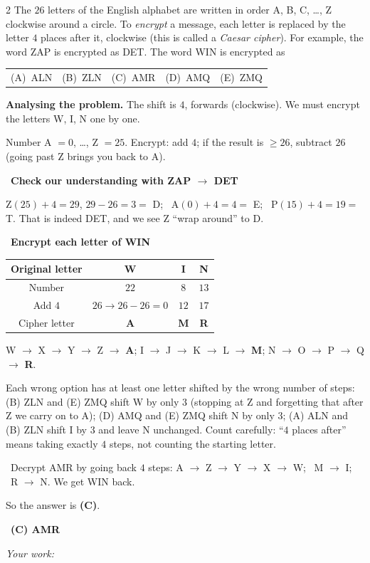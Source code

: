 \documentclass[11pt]{article}
\makeatletter
\newif\ifsol \solfalse
\providecommand{\AnsWord}{Đáp số}
\newenvironment{probbox}[2]{\begin{probboxT}{#1}{#2}}{\end{probboxT}}
\newcommand{\StuProb}[2]{\begin{probboxS}{#1}{#2}\StuProbBody\end{probboxS}}
\newcommand{\ans}[1]{\par\smallskip{\bfseries\color{tmGreen!88!black}\AnsWord:}\ {\bfseries\color{AnsRed}#1}\par}
\newcommand{\probsol}[1]{%
  \begin{lrbox}{\solmeasure}\begin{minipage}{\dimexpr\linewidth-24pt\relax}#1\end{minipage}\end{lrbox}%
  \ifsol
    \begin{solbox}#1\end{solbox}%
  \else
    \setlength{\solht}{\dimexpr\ht\solmeasure+\dp\solmeasure+0.85cm\relax}%
    \ifdim\solht<1.35cm\setlength{\solht}{1.35cm}\fi
    \ifdim\solht>\StudentMaxWork\setlength{\solht}{\StudentMaxWork}\fi
    \par\noindent\begin{minipage}{\linewidth}%
    \expandafter\StuProb\StuProbArgs
    \begin{tcolorbox}[colback=white,colframe=Line,boxrule=0.8pt,arc=5pt,
      left=8pt,right=8pt,top=4pt,bottom=4pt,height=\solht]{\footnotesize\color{Slate}\itshape\WorkWord}\end{tcolorbox}%
    \end{minipage}\par\medskip
  \fi}
\newlength{\StudentMaxWork}\setlength{\StudentMaxWork}{4.5cm}
\newcommand{\step}[2]{\par\smallskip\noindent{\bfseries\color{tmBlue!85!black}\StepWord~#1.}\ {\bfseries #2}\par\nopagebreak}
\newcommand{\verify}[1]{\par\smallskip\noindent{\bfseries\color{tmGreen!80!black}\faCheckCircle\ \CheckWord}\ #1\par}
\newcommand{\choices}[5]{\par\smallskip\noindent
  \begin{tabularx}{\linewidth}{@{}XXXXX@{}}(A)\ #1&(B)\ #2&(C)\ #3&(D)\ #4&(E)\ #5\end{tabularx}\par}
\def\WorkWord{Your work:}
\def\AnsWord{Answer}
\def\StepWord{Step}
\def\CheckWord{Check:}
\makeatother
\begin{document}
\begin{probbox}{2}{\relax}
The $26$ letters of the English alphabet are written in order A, B, C, \ldots, Z clockwise around a circle. To \emph{encrypt} a message,
each letter is replaced by the letter $4$ places after it, clockwise (this is called a \emph{Caesar cipher}). For example, the word ZAP
is encrypted as DET. The word WIN is encrypted as
\choices{ALN}{ZLN}{AMR}{AMQ}{ZMQ}
\end{probbox}
\probsol{
\textbf{Analysing the problem.} The shift is $4$, forwards (clockwise). We must encrypt the letters W, I, N one by one.
\begin{recallbox}Number A $= 0$, \ldots, Z $= 25$. Encrypt: add $4$; if the result is $\ge 26$, subtract $26$ (going past Z brings you back to A).\end{recallbox}
\step{1}{Check our understanding with ZAP $\to$ DET}
Z$(25) + 4 = 29$, $29 - 26 = 3 =$ D; \ A$(0) + 4 = 4 =$ E; \ P$(15) + 4 = 19 =$ T. That is indeed DET, and we see Z ``wrap around'' to D.
\step{2}{Encrypt each letter of WIN}
\begin{center}
\begin{tabular}{|c|c|c|c|}
\hline
\rowcolor{tmBlue!10} Original letter & W & I & N \\ \hline
Number & $22$ & $8$ & $13$ \\ \hline
Add $4$ & $26 \to 26 - 26 = 0$ & $12$ & $17$ \\ \hline
Cipher letter & \textbf{A} & \textbf{M} & \textbf{R} \\ \hline
\end{tabular}
\end{center}
\begin{center}
W $\to$ X $\to$ Y $\to$ Z $\to$ \textbf{A}; \qquad I $\to$ J $\to$ K $\to$ L $\to$ \textbf{M}; \qquad N $\to$ O $\to$ P $\to$ Q $\to$ \textbf{R}.
\end{center}
\begin{warnbox}Each wrong option has at least one letter shifted by the wrong number of steps: (B) ZLN and (E) ZMQ shift W by only $3$
(stopping at Z and forgetting that after Z we carry on to A); (D) AMQ and (E) ZMQ shift N by only $3$; (A) ALN and (B) ZLN shift I by
$3$ and leave N unchanged. Count carefully: ``$4$ places after'' means taking exactly $4$ steps, not counting the starting letter.\end{warnbox}
\verify{Decrypt AMR by going back $4$ steps: A $\to$ Z $\to$ Y $\to$ X $\to$ W; \ M $\to$ I; \ R $\to$ N. We get WIN back.}
So the answer is \textbf{(C)}.
\ans{(C) AMR}
}
\end{document}
